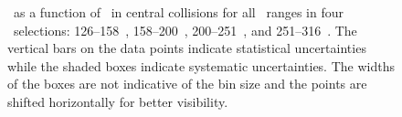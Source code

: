 \begin{figure}
   \caption{\DeltaDptr\ as a function of \rvar\ in central collisions for all \pt\ ranges in four \ptjet\ selections: 126--158~\GeV, 158--200~\GeV, 200--251~\GeV, and 251--316~\GeV. The vertical bars on the data points indicate statistical uncertainties while the shaded boxes indicate systematic uncertainties. The widths of the boxes are not indicative of the bin size and the points are shifted horizontally for better visibility. }
      \label{fig:deltadptr}
\end{figure}
\FloatBarrier

